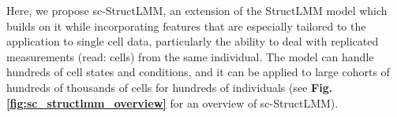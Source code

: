 
Here, we propose sc-StructLMM, an extension of the StructLMM model which builds on it while 
incorporating features that are especially tailored to the application to single cell data, particularly the ability to deal with replicated measurements (read: cells) from the same individual.
The model can handle hundreds of cell states and conditions, and it can be applied to large cohorts of hundreds of thousands of cells for hundreds of  individuals (see \textbf{Fig. \ref{fig:sc_structlmm_overview}} for an overview of sc-StructLMM).



